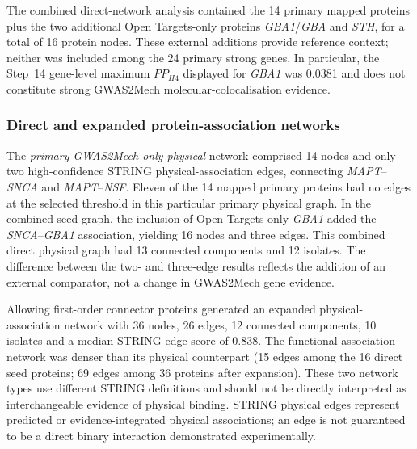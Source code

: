 \documentclass[11pt,a4paper]{article}
\begin{document}
The combined direct-network analysis contained the 14 primary mapped proteins plus the two additional Open Targets-only proteins \textit{GBA1}/\textit{GBA} and \textit{STH}, for a total of 16 protein nodes. These external additions provide reference context; neither was included among the 24 primary strong genes. In particular, the Step~14 gene-level maximum $PP_{H4}$ displayed for \textit{GBA1} was 0.0381 and does not constitute strong GWAS2Mech molecular-colocalisation evidence.

\subsubsection{Direct and expanded protein-association networks}
The \emph{primary GWAS2Mech-only physical} network comprised 14 nodes and only two high-confidence STRING physical-association edges, connecting \textit{MAPT}--\textit{SNCA} and \textit{MAPT}--\textit{NSF}. Eleven of the 14 mapped primary proteins had no edges at the selected threshold in this particular primary physical graph. In the combined seed graph, the inclusion of Open Targets-only \textit{GBA1} added the \textit{SNCA}--\textit{GBA1} association, yielding 16 nodes and three edges. This combined direct physical graph had 13 connected components and 12 isolates. The difference between the two- and three-edge results reflects the addition of an external comparator, not a change in GWAS2Mech gene evidence.

Allowing first-order connector proteins generated an expanded physical-association network with 36 nodes, 26 edges, 12 connected components, 10 isolates and a median STRING edge score of 0.838. The functional association network was denser than its physical counterpart (15 edges among the 16 direct seed proteins; 69 edges among 36 proteins after expansion). These two network types use different STRING definitions and should not be directly interpreted as interchangeable evidence of physical binding. STRING physical edges represent predicted or evidence-integrated physical associations; an edge is not guaranteed to be a direct binary interaction demonstrated experimentally.
\end{document}
